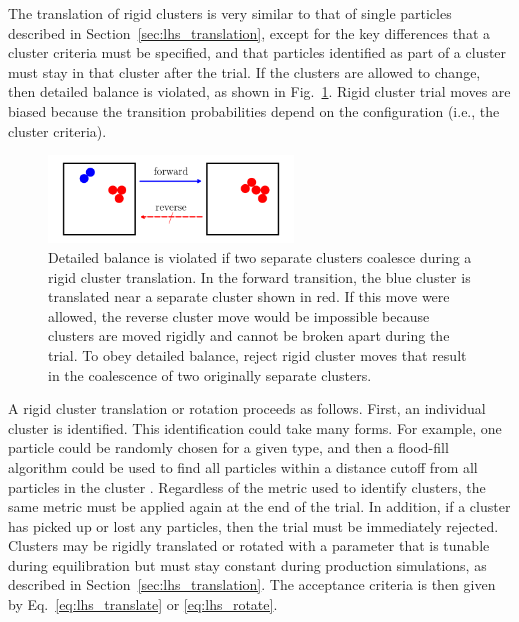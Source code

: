 \documentclass[
  9pt,
  bestpractices,
  pubversion,
]{livecoms}
\begin{document}
The translation of rigid clusters is very similar to that of single particles described in Section~\ref{sec:lhs_translation}, except for the key differences that a cluster criteria must be specified, and that particles identified as part of a cluster must stay in that cluster after the trial.
If the clusters are allowed to change, then detailed balance is violated, as shown in Fig.~\ref{fig:cluster}.
Rigid cluster trial moves are biased because the transition probabilities depend on the configuration (i.e., the cluster criteria).

\begin{figure}
\begin{centering}
\includegraphics[width=6.5cm]{../figures/cluster.pdf}
\caption{
Detailed balance is violated if two separate clusters coalesce during a rigid cluster translation.
In the forward transition, the blue cluster is translated near a separate cluster shown in red.
If this move were allowed, the reverse cluster move would be impossible because clusters are moved rigidly and cannot be broken apart during the trial.
To obey detailed balance, reject rigid cluster moves that result in the coalescence of two originally separate clusters.
}
\label{fig:cluster}
\end{centering}
\end{figure}

A rigid cluster translation or rotation proceeds as follows.
First, an individual cluster is identified.
This identification could take many forms.
For example, one particle could be randomly chosen for a given type, and then a flood-fill algorithm could be used to find all particles within a distance cutoff from all particles in the cluster \cite{hatch_self-assembly_2016}.
Regardless of the metric used to identify clusters, the same metric must be applied again at the end of the trial.
In addition, if a cluster has picked up or lost any particles, then the trial must be immediately rejected.
Clusters may be rigidly translated or rotated with a parameter that is tunable during equilibration but must stay constant during production simulations, as described in Section~\ref{sec:lhs_translation}.
The acceptance criteria is then given by Eq.~\ref{eq:lhs_translate} or \ref{eq:lhs_rotate}.
\end{document}
